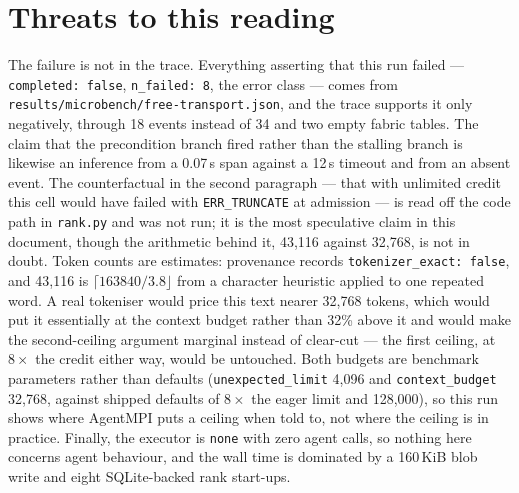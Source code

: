 \documentclass[11pt]{article}
\begin{document}
\section{Threats to this reading}

The failure is not in the trace. Everything asserting that this run failed ---
\texttt{completed: false}, \texttt{n\_failed: 8}, the error class --- comes from
\texttt{results/microbench/free-transport.json}, and the trace supports it only
negatively, through 18 events instead of 34 and two empty fabric tables. The claim
that the precondition branch fired rather than the stalling branch is likewise an
inference from a 0.07\,s span against a 12\,s timeout and from an absent event. The
counterfactual in the second paragraph --- that with unlimited credit this cell would
have failed with \texttt{ERR\_TRUNCATE} at admission --- is read off the code path in
\texttt{rank.py} and was not run; it is the most speculative claim in this document,
though the arithmetic behind it, 43{,}116 against 32{,}768, is not in doubt. Token
counts are estimates: provenance records \texttt{tokenizer\_exact: false}, and 43{,}116
is $\lceil 163840/3.8 \rfloor$ from a character heuristic applied to one repeated
word. A real tokeniser would price this text nearer 32{,}768 tokens, which would put
it essentially at the context budget rather than 32\% above it and would make the
second-ceiling argument marginal instead of clear-cut --- the first ceiling, at
$8\times$ the credit either way, would be untouched. Both budgets are benchmark
parameters rather than defaults (\texttt{unexpected\_limit} 4{,}096 and
\texttt{context\_budget} 32{,}768, against shipped defaults of $8\times$ the eager
limit and 128{,}000), so this run shows where AgentMPI puts a ceiling when told to,
not where the ceiling is in practice. Finally, the executor is \texttt{none} with
zero agent calls, so nothing here concerns agent behaviour, and the wall time is
dominated by a 160\,KiB blob write and eight SQLite-backed rank start-ups.
\end{document}
